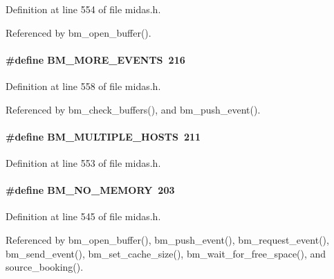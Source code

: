 Definition at line 554 of file midas.h.

Referenced by bm\_\-open\_\-buffer().
\paragraph[{BM\_\-MORE\_\-EVENTS}]{\setlength{\rightskip}{0pt plus 5cm}\#define BM\_\-MORE\_\-EVENTS~216}\hfill\label{group__err22_ga0ef7db8ae9812d639f07e3d654d76e90}

\begin{DoxyItemize}
\item 
\end{DoxyItemize}

Definition at line 558 of file midas.h.

Referenced by bm\_\-check\_\-buffers(), and bm\_\-push\_\-event().
\paragraph[{BM\_\-MULTIPLE\_\-HOSTS}]{\setlength{\rightskip}{0pt plus 5cm}\#define BM\_\-MULTIPLE\_\-HOSTS~211}\hfill\label{group__err22_gad1a172c4643fd4a0227f0df5bcfbd0b4}

\begin{DoxyItemize}
\item 
\end{DoxyItemize}

Definition at line 553 of file midas.h.
\paragraph[{BM\_\-NO\_\-MEMORY}]{\setlength{\rightskip}{0pt plus 5cm}\#define BM\_\-NO\_\-MEMORY~203}\hfill\label{group__err22_ga5425d2a3621de60926128a3cbaa501cc}

\begin{DoxyItemize}
\item 
\end{DoxyItemize}

Definition at line 545 of file midas.h.

Referenced by bm\_\-open\_\-buffer(), bm\_\-push\_\-event(), bm\_\-request\_\-event(), bm\_\-send\_\-event(), bm\_\-set\_\-cache\_\-size(), bm\_\-wait\_\-for\_\-free\_\-space(), and source\_\-booking().
